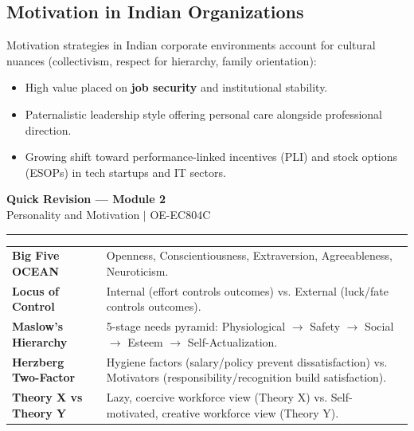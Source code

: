 \documentclass[11pt,a4paper]{article}
\begin{document}
\subsection{Motivation in Indian Organizations}
Motivation strategies in Indian corporate environments account for cultural nuances (collectivism, respect for hierarchy, family orientation):
\begin{itemize}[leftmargin=*, itemsep=3pt]
  \item High value placed on \textbf{job security} and institutional stability.
  \item Paternalistic leadership style offering personal care alongside professional direction.
  \item Growing shift toward performance-linked incentives (PLI) and stock options (ESOPs) in tech startups and IT sectors.
\end{itemize}

\newpage
\begin{center}
  {\large\bfseries\color{myred} Quick Revision --- Module 2}\\[3pt]
  {\small\color{mydark} Personality and Motivation $|$ OE-EC804C}
\end{center}
\vspace{-4pt}
\hrule
\vspace{8pt}

\begin{tcolorbox}[formulabox, title={\textbf{Key Concepts and Metrics at a Glance}}]
\renewcommand{\arraystretch}{1.35}
\begin{tabularx}{\linewidth}{>{\raggedright\arraybackslash\bfseries}p{4.5cm} X}
Big Five OCEAN & Openness, Conscientiousness, Extraversion, Agreeableness, Neuroticism. \\[4pt]
Locus of Control & Internal (effort controls outcomes) vs. External (luck/fate controls outcomes). \\[4pt]
Maslow's Hierarchy & 5-stage needs pyramid: Physiological $\to$ Safety $\to$ Social $\to$ Esteem $\to$ Self-Actualization. \\[4pt]
Herzberg Two-Factor & Hygiene factors (salary/policy prevent dissatisfaction) vs. Motivators (responsibility/recognition build satisfaction). \\[4pt]
Theory X vs Theory Y & Lazy, coercive workforce view (Theory X) vs. Self-motivated, creative workforce view (Theory Y). \\
\end{tabularx}
\end{tcolorbox}
\end{document}
